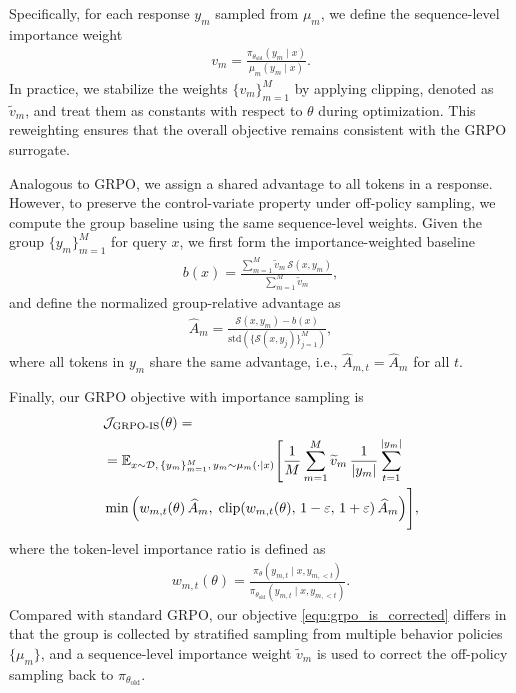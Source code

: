 \documentclass{article}
\theoremstyle{plain}
\theoremstyle{definition}
\theoremstyle{remark}
\begin{document}
Specifically, for each response $y_m$ sampled from $\mu_m$, we define the sequence-level importance weight
\begin{align*}
v_m = \frac{\pi_{\theta_\text{old}}(y_m \mid x)}{\mu_m(y_m \mid x)}.
\end{align*}
In practice, we stabilize the weights $\{v_m\}_{m=1}^M$ by applying clipping, denoted as $\widetilde{v}_m$, and treat them as constants with respect to $\theta$ during optimization.
This reweighting ensures that the overall objective remains consistent with the GRPO surrogate.

Analogous to GRPO, we assign a shared advantage to all tokens in a response.
However, to preserve the control-variate property under off-policy sampling, we compute the group baseline using the same sequence-level weights.
Given the group $\{y_m\}_{m=1}^M$ for query $x$, we first form the importance-weighted baseline
\begin{align*}
b(x)=\frac{\sum_{m=1}^{M} \widetilde{v}_m \, \mathcal{S}(x,y_m)}{\sum_{m=1}^{M} \widetilde{v}_m},
\end{align*}
and define the normalized group-relative advantage as
\begin{align*}
\widehat{A}_m
=
\frac{\mathcal{S}(x,y_m)-b(x)}
{\mathrm{std}\!\left(\{\mathcal{S}(x,y_j)\}_{j=1}^{M}\right)},
\end{align*}
where all tokens in $y_m$ share the same advantage, i.e., $\widehat{A}_{m,t}=\widehat{A}_m$ for all $t$.

Finally, our GRPO objective with importance sampling is
\begin{align}
\label{equ:grpo_is_corrected}
&\mathcal{J}_\text{GRPO-IS}(\theta)
= \notag \\
&=\mathbb{E}_{ x \sim \mathcal{D},\, \{y_m\}_{m=1}^M,\, y_m \sim \mu_m(\cdot \mid x) }
\Bigg[
\frac{1}{M}\sum_{m=1}^{M} \widetilde{v}_m\,
\frac{1}{|y_m|}\sum_{t=1}^{|y_m|}
\notag \\&\min \Big(
w_{m,t}(\theta)\, \widehat{A}_{m},\;
\mathrm{clip}\!\left( w_{m,t}(\theta),\, 1 - {\varepsilon},\, 1 + {\varepsilon}\right) \widehat{A}_{m}
\Big)
\Bigg],
\end{align}
where the token-level importance ratio is defined as
\begin{align*}
w_{m,t}(\theta)=\frac{ \pi_{\theta} (y_{m,t} \mid x, y_{m,<t}) }{ \pi_{\theta_\text{old}} (y_{m,t} \mid x, y_{m,<t}) }.
\end{align*}
Compared with standard GRPO, our objective \eqref{equ:grpo_is_corrected} differs in that the group is collected by stratified sampling from multiple behavior policies $\{\mu_m\}$, and a sequence-level importance weight $\widetilde{v}_m$ is used to correct the off-policy sampling back to $\pi_{\theta_\text{old}}$.
\end{document}
